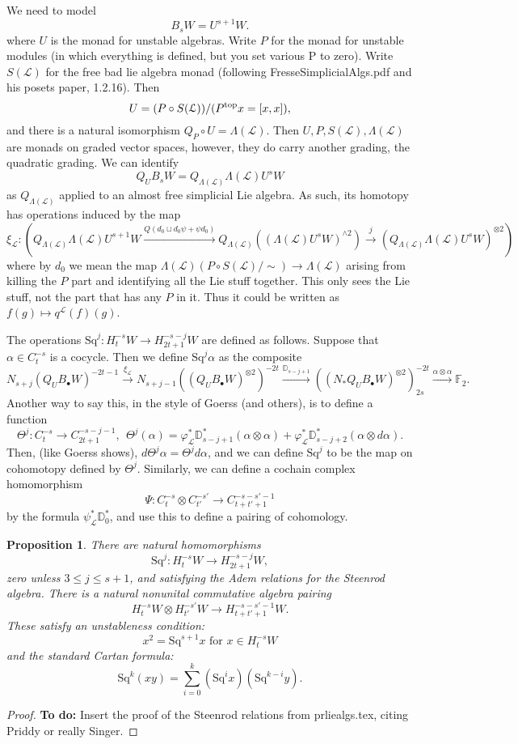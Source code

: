 \documentclass[11pt]{amsart}
\theoremstyle{plain}
\newtheorem{prop}[thm]{Proposition}
\theoremstyle{definition}
\let\phi\varphi
\renewcommand{\to}{\longrightarrow}
\newcommand{\calL}{\mathcal{L}}
\theoremstyle{plain}
\newcommand{\Sq}{\mathrm{Sq}}
\newcommand{\F}{\mathbb{F}}
\begin{document}
We need to model
\[B_sW=U^{s+1}W.\]
where $U$ is the monad for unstable algebras. Write $P$ for the monad for unstable modules (in which everything is defined, but you set various P to zero). Write $S(\calL)$ for the free bad lie algebra monad (following FresseSimplicialAlgs.pdf and his posets paper, 1.2.16). Then
\[U=(P\circ S(\calL))/(P^\textup{top}x=[x,x]),\]
and there is a natural isomorphism $Q_P\circ U=\Lambda(\calL)$. Then $U,P,S(\calL),\Lambda(\calL)$ are monads on graded vector spaces, however, they do carry another grading, the quadratic grading. We can identify
\[Q_UB_sW=Q_{\Lambda(\calL)}\Lambda(\calL)U^sW\]
as $Q_{\Lambda(\calL)}$ applied to an almost free simplicial Lie algebra. As such, its homotopy has operations induced by the map
\[\xi_\calL:\left(Q_{\Lambda(\calL)}\Lambda(\calL)U^{s+1}W
\overset{Q(d_0\sqcup d_0\psi+\psi d_0)}{\to}
Q_{\Lambda(\calL)}((\Lambda(\calL)U^sW)^{\wedge2})\overset{j}{\to}
(Q_{\Lambda(\calL)}\Lambda(\calL)U^sW)^{\otimes2}\right)\]
where by $d_0$ we mean the map $\Lambda(\calL)(P\circ S(\calL)/\sim)\to \Lambda(\calL)$ arising from killing the $P$ part and identifying all the Lie stuff together. This only sees the Lie stuff, not the part that has any $P$ in it. Thus it could be written as $f(g)\mapsto q^\calL(f)(g)$.

The operations $\Sq^j:H_t^{-s}W\to H_{2t+1}^{-s-j}W$ are defined as follows. Suppose that $\alpha\in C_t^{-s}$ is a cocycle. Then we define $\Sq^j\alpha$ as the composite
\[N_{s+j}(Q_UB_{\bullet}W)^{-2t-1}\overset{\xi_\calL}{\to}N_{s+j-1}((Q_UB_{\bullet}W)^{\otimes2})^{-2t}\overset{\mathbb{D}_{s-j+1}}{\to}
((N_*Q_UB_{\bullet}W)^{\otimes2})^{-2t}_{2s}\overset{\alpha\otimes\alpha}{\to}\F_2.
\]
Another way to say this, in the style of Goerss (and others), is to define a function
\[\Theta^j:C_{t}^{-s}\to C_{2t+1}^{-s-j-1},\ \ \Theta^j(\alpha)=\phi^*_\calL\mathbb{D}_{s-j+1}^*(\alpha\otimes\alpha)+ \phi^*_\calL\mathbb{D}_{s-j+2}^*(\alpha\otimes d\alpha).\]
Then, (like Goerss shows), $d\Theta^j\alpha=\Theta^jd\alpha$, and we can define $\Sq^j$ to be the map on cohomotopy defined by $\Theta^j$. Similarly, we can define a cochain complex homomorphism
\[\Psi:C_t^{-s}\otimes C_{t'}^{-s'}\to C_{t+t'+1}^{-s-s'-1}\]
by the formula $\psi^*_\calL\mathbb{D}_0^*$, and use this to define a pairing of cohomology.
\begin{prop}
There are natural homomorphisms
\[\Sq^j:H_t^{-s}W\to H_{2t+1}^{-s-j}W,\]
zero unless $3\leq j\leq s+1$, and satisfying the Adem relations for the Steenrod algebra. There is a natural nonunital commutative algebra pairing
\[H_t^{-s}W\otimes H_{t'}^{-s'}W\to H_{t+t'+1}^{-s-s'-1}W.\]
These satisfy an unstableness condition:
\[x^2=\Sq^{s+1}x\text{ for }x\in H^{-s}_tW\]
and the standard Cartan formula:
\[\Sq^k(xy)=\sum_{i=0}^k(\Sq^ix)(\Sq^{k-i}y).\]
\end{prop}
\begin{proof}
\textbf{To do:} Insert the proof of the Steenrod relations from prliealgs.tex, citing Priddy or really Singer.
\end{proof}
\end{document}
